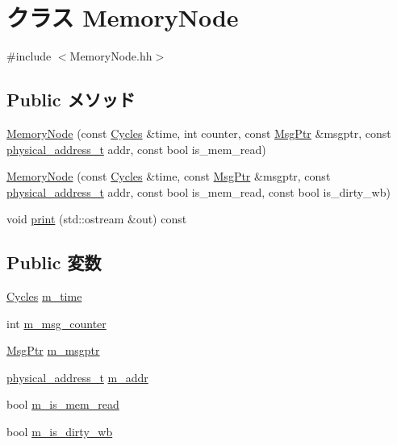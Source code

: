 \hypertarget{classMemoryNode}{
\section{クラス MemoryNode}
\label{classMemoryNode}
}


{\ttfamily \#include $<$MemoryNode.hh$>$}\subsection*{Public メソッド}
\begin{DoxyCompactItemize}
\item 
\hyperlink{classMemoryNode_a2ca4c85a990bb6c3970c66f977b8dc50}{MemoryNode} (const \hyperlink{classCycles}{Cycles} \&time, int counter, const \hyperlink{classRefCountingPtr}{MsgPtr} \&msgptr, const \hyperlink{TypeDefines_8hh_a7901e1a365850c5ff38ec6e12b6b9ffc}{physical\_\-address\_\-t} addr, const bool is\_\-mem\_\-read)
\item 
\hyperlink{classMemoryNode_a38258165f21c162baa85ffad137fb8d2}{MemoryNode} (const \hyperlink{classCycles}{Cycles} \&time, const \hyperlink{classRefCountingPtr}{MsgPtr} \&msgptr, const \hyperlink{TypeDefines_8hh_a7901e1a365850c5ff38ec6e12b6b9ffc}{physical\_\-address\_\-t} addr, const bool is\_\-mem\_\-read, const bool is\_\-dirty\_\-wb)
\item 
void \hyperlink{classMemoryNode_ac55fe386a101fbae38c716067c9966a0}{print} (std::ostream \&out) const 
\end{DoxyCompactItemize}
\subsection*{Public 変数}
\begin{DoxyCompactItemize}
\item 
\hyperlink{classCycles}{Cycles} \hyperlink{classMemoryNode_ac39faf9ea84c2e7518ba2f960c661636}{m\_\-time}
\item 
int \hyperlink{classMemoryNode_acfac131e63985feff04ed11cbaf0d221}{m\_\-msg\_\-counter}
\item 
\hyperlink{classRefCountingPtr}{MsgPtr} \hyperlink{classMemoryNode_a0190ebd96c557881596457a02c2f8743}{m\_\-msgptr}
\item 
\hyperlink{TypeDefines_8hh_a7901e1a365850c5ff38ec6e12b6b9ffc}{physical\_\-address\_\-t} \hyperlink{classMemoryNode_a87dedd4d12dd06f03efa1a9c2301bfc6}{m\_\-addr}
\item 
bool \hyperlink{classMemoryNode_a364a76c8c3f0d9225ec87b42a36b9264}{m\_\-is\_\-mem\_\-read}
\item 
bool \hyperlink{classMemoryNode_ac2c60a723b1878520874acc283e013a5}{m\_\-is\_\-dirty\_\-wb}
\end{DoxyCompactItemize}


